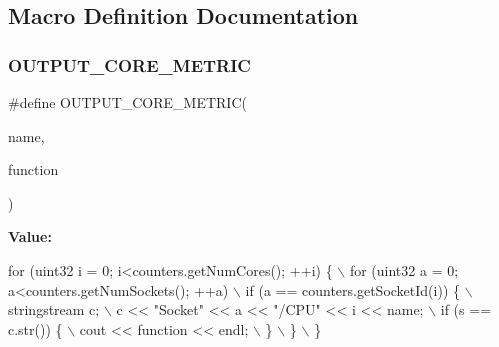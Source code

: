 \subsection{Macro Definition Documentation}
\mbox{\label{pcm-sensor_8cpp_af87f81d4e36dbea17fda4544fedae80b}} 
\subsubsection{\texorpdfstring{O\+U\+T\+P\+U\+T\+\_\+\+C\+O\+R\+E\+\_\+\+M\+E\+T\+R\+IC}{OUTPUT\_CORE\_METRIC}}
{\footnotesize\ttfamily \#define O\+U\+T\+P\+U\+T\+\_\+\+C\+O\+R\+E\+\_\+\+M\+E\+T\+R\+IC(\begin{DoxyParamCaption}\item[{}]{name,  }\item[{}]{function }\end{DoxyParamCaption})}

{\bfseries Value\+:}
\begin{DoxyCode}
\textcolor{keywordflow}{for} (uint32 i = 0; i<counters.getNumCores(); ++i) \{ \(\backslash\)
                             for (uint32 a = 0; a<counters.getNumSockets(); ++a) \(\backslash\)
                                                  \textcolor{keywordflow}{if} (a == counters.getSocketId(i)) \{ \(\backslash\)
                                                      stringstream c; \(\backslash\)
                                                      c << \textcolor{stringliteral}{"Socket"} << a << \textcolor{stringliteral}{"/CPU"} << i << name; \(\backslash\)
                                                      if (s == c.str()) \{ \(\backslash\)
                                                          cout << \textcolor{keyword}{function} << endl; \(\backslash\)
                                                      \} \(\backslash\)
                                                  \} \(\backslash\)
                                                  \}
\end{DoxyCode}
\mbox{\label{pcm-sensor_8cpp_abfcf6ac619060882e6abd536ac9541c4}} 

